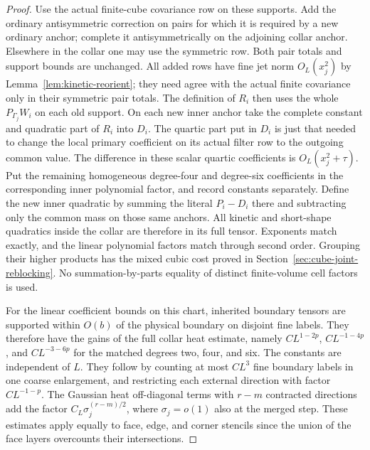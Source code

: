 \documentclass[11pt]{article}
\theoremstyle{definition}
\begin{document}
\begin{proof}
Use the actual finite-cube covariance row on these supports.
Add the ordinary antisymmetric correction on pairs for which
it is required by a new ordinary anchor; complete it
antisymmetrically on the adjoining collar anchor. Elsewhere in
the collar one may use the symmetric row. Both pair totals
and support bounds are unchanged. All added rows have fine
jet norm \(O_L(x_j^2)\) by
Lemma~\ref{lem:kinetic-reorient}; they need agree with the actual
finite covariance only in their symmetric pair totals.
The definition of \(R_i\) then uses the whole \(P_{\Gamma_j}W_i\)
on each old support. On each new inner anchor take the complete
constant and quadratic part of \(R_i\) into \(D_i\).
The quartic part put in \(D_i\) is just that needed to change
the local primary coefficient on its actual filter row to
the outgoing common value. The difference in these scalar
quartic coefficients is \(O_L(x_j^2+\tau)\).
Put the remaining homogeneous degree-four and degree-six
coefficients in the corresponding inner polynomial factor,
and record constants separately. Define the new inner
quadratic by summing the literal \(P_i-D_i\) there and
subtracting only the common mass on those same anchors.
All kinetic and short-shape quadratics inside the collar are
therefore in its full tensor. Exponents match exactly, and
the linear polynomial factors match through second order.
Grouping their higher products has the mixed cubic cost
proved in Section~\ref{sec:cube-joint-reblocking}.
No summation-by-parts equality of distinct finite-volume
cell factors is used.

For the linear coefficient bounds on this chart, inherited
boundary tensors are supported within \(O(b)\) of the
physical boundary on disjoint fine labels. They therefore
have the gains of the full collar heat estimate, namely
\(C L^{1-2p}\), \(C L^{-1-4p}\), and \(C L^{-3-6p}\)
for the matched degrees two, four, and six. The constants
are independent of \(L\). They follow by counting at most
\(C L^3\) fine boundary labels in one coarse enlargement,
and restricting each external direction with factor
\(C L^{-1-p}\). The Gaussian heat off-diagonal terms with
\(r-m\) contracted directions add the factor
\(C_L\sigma_j^{(r-m)/2}\), where \(\sigma_j=o(1)\) also at
the merged step. These estimates apply equally to face,
edge, and corner stencils since the union of the face
layers overcounts their intersections.


\end{proof}
\end{document}
